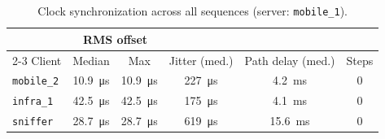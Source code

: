 \begin{table}[t]
\centering
\caption{Clock synchronization across all sequences (server:
\texttt{mobile\_1}). 
}
\label{tab:ntp}
\footnotesize
\begin{tabular}{@{}lccccc@{}}
\toprule
& \multicolumn{2}{c}{RMS offset} & & & \\
\cmidrule(lr){2-3}
Client & Median & Max & Jitter (med.) & Path delay (med.) & Steps \\
\midrule
\texttt{mobile\_2} & \SI{10.9}{\micro\second} & \SI{10.9}{\micro\second} & \SI{227}{\micro\second} & \SI{4.2}{\milli\second}  & 0 \\
\texttt{infra\_1}  & \SI{42.5}{\micro\second} & \SI{42.5}{\micro\second} & \SI{175}{\micro\second} & \SI{4.1}{\milli\second}  & 0 \\
\texttt{sniffer}   & \SI{28.7}{\micro\second} & \SI{28.7}{\micro\second} & \SI{619}{\micro\second} & \SI{15.6}{\milli\second} & 0 \\
\bottomrule
\end{tabular}
\end{table}
